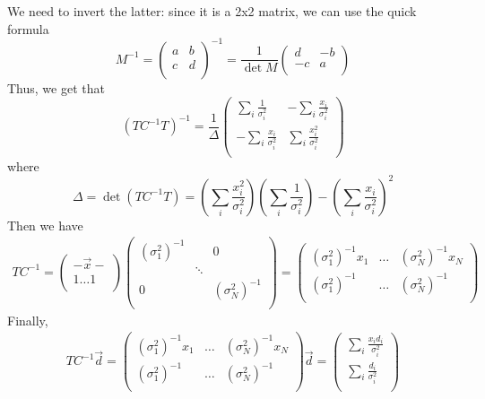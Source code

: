 \documentclass[a4paper,11pt,fleqn]{article}
\begin{document}
We need to invert the latter: since it is a 2x2 matrix, we can use the 
quick formula 
\begin{equation}
    M^{-1} = 
    \begin{pmatrix}
        a & b \\
        c & d \\
    \end{pmatrix}^{-1}
    = \frac{1}{\det M}
    \begin{pmatrix}
        d & -b \\
        -c & a \\
    \end{pmatrix}
\end{equation}
Thus, we get that 
\begin{equation}
    \label{eqn:cov_par}
    (TC^{-1}T)^{-1} = \frac{1}{\Delta}
    \begin{pmatrix}
        \sum_i \frac{1}{\sigma_i^2} & -\sum_i \frac{x_i}{\sigma_i^2} \\
        -\sum_i \frac{x_i}{\sigma_i^2} & \sum_i \frac{x_i^2}{\sigma_i^2} \\
    \end{pmatrix}
\end{equation}
where 
\begin{equation}
    \Delta = \det(TC^{-1}T) = \left(\sum_i\frac{x_i^2}{\sigma_i^2}\right)\left(\sum_i\frac{1}{\sigma_i^2}\right)-\left(\sum_i\frac{x_i}{\sigma_i^2}\right)^2
\end{equation}
Then we have 
\begin{gather*}
    TC^{-1} = 
    \begin{pmatrix}
        -\vec{x}- \\
        1 \dotsc 1 \\
    \end{pmatrix}
    \begin{pmatrix}
        (\sigma_1^2)^{-1} &  & 0\\
        & \ddots & \\
        0 & & (\sigma_N^2)^{-1} \\
    \end{pmatrix}
    = 
    \begin{pmatrix}
        (\sigma_1^2)^{-1}x_1 & \dotsc & (\sigma_N^2)^{-1}x_N \\
        (\sigma_1^2)^{-1} & \dotsc  & (\sigma_N^2)^{-1} \\
    \end{pmatrix}
\end{gather*}
Finally, 
\begin{gather*}
    TC^{-1}\vec{d} = 
    \begin{pmatrix}
        (\sigma_1^2)^{-1}x_1 & \dotsc & (\sigma_N^2)^{-1}x_N \\
        (\sigma_1^2)^{-1} & \dotsc  & (\sigma_N^2)^{-1} \\
    \end{pmatrix} \vec{d} = 
    \begin{pmatrix}
        \sum_i \frac{x_i d_i}{\sigma_i^2} \\
        \sum_i \frac{d_i}{\sigma_i^2} \\
    \end{pmatrix}
\end{gather*}
\end{document}
